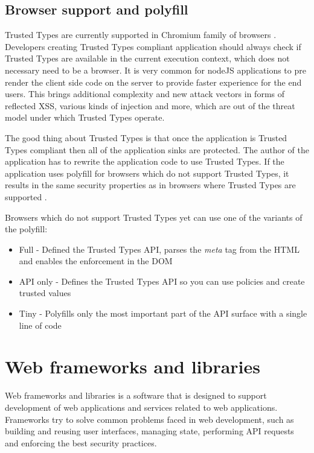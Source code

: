 \subsection{Browser support and polyfill}

Trusted Types are currently supported in Chromium family of browsers \cite{mdn:tt_compatibility}.
Developers creating Trusted Types compliant application should always check if Trusted Types are
available in the current execution context, which does not necessary need to be a browser. It is
very common for nodeJS applications to pre render the client side code on the server to provide
faster experience for the end users. This brings additional complexity and new attack vectors in
forms of reflected XSS, various kinds of injection and more, which are out of the threat model under
which Trusted Types operate.

The good thing about Trusted Types is that once the application is Trusted Types compliant then all
of the application sinks are protected. The author of the application has to rewrite the application
code to use Trusted Types. If the application uses polyfill for browsers which do not support
Trusted Types, it results in the same security properties as in browsers where Trusted Types are
supported \cite{xss_nowhere_with_polyfill}.

Browsers which do not support Trusted Types yet can use one of the variants of the polyfill:

\begin{itemize}
  \item Full - Defined the Trusted Types API, parses the \textit{meta} tag from the HTML and enables
        the enforcement in the DOM
  \item API only - Defines the Trusted Types API so you can use policies and create trusted values
  \item Tiny - Polyfills only the most important part of the API surface with a single line of code
\end{itemize}

\section{Web frameworks and libraries}

Web frameworks and libraries is a software that is designed to support development of web
applications and services related to web applications. Frameworks try to solve common problems faced
in web development, such as building and reusing user interfaces, managing state, performing API
requests and enforcing the best security practices.

